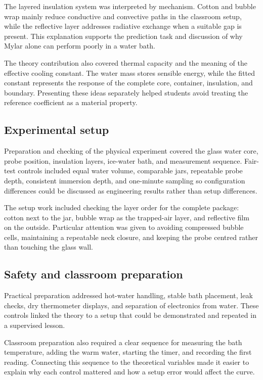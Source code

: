 \documentclass[10pt,conference,a4paper]{IEEEtran}
\begin{document}
The layered insulation system was interpreted by mechanism. Cotton and bubble wrap mainly reduce conductive and convective paths in the classroom setup, while the reflective layer addresses radiative exchange when a suitable gap is present. This explanation supports the prediction task and discussion of why Mylar alone can perform poorly in a water bath.

The theory contribution also covered thermal capacity and the meaning of the effective cooling constant. The water mass stores sensible energy, while the fitted constant represents the response of the complete core, container, insulation, and boundary. Presenting these ideas separately helped students avoid treating the reference coefficient as a material property.

\subsection*{Experimental setup}

Preparation and checking of the physical experiment covered the glass water core, probe position, insulation layers, ice-water bath, and measurement sequence. Fair-test controls included equal water volume, comparable jars, repeatable probe depth, consistent immersion depth, and one-minute sampling so configuration differences could be discussed as engineering results rather than setup differences.

The setup work included checking the layer order for the complete package: cotton next to the jar, bubble wrap as the trapped-air layer, and reflective film on the outside. Particular attention was given to avoiding compressed bubble cells, maintaining a repeatable neck closure, and keeping the probe centred rather than touching the glass wall.

\subsection*{Safety and classroom preparation}

Practical preparation addressed hot-water handling, stable bath placement, leak checks, dry thermometer displays, and separation of electronics from water. These controls linked the theory to a setup that could be demonstrated and repeated in a supervised lesson.

Classroom preparation also required a clear sequence for measuring the bath temperature, adding the warm water, starting the timer, and recording the first reading. Connecting this sequence to the theoretical variables made it easier to explain why each control mattered and how a setup error would affect the curve.
\end{document}
